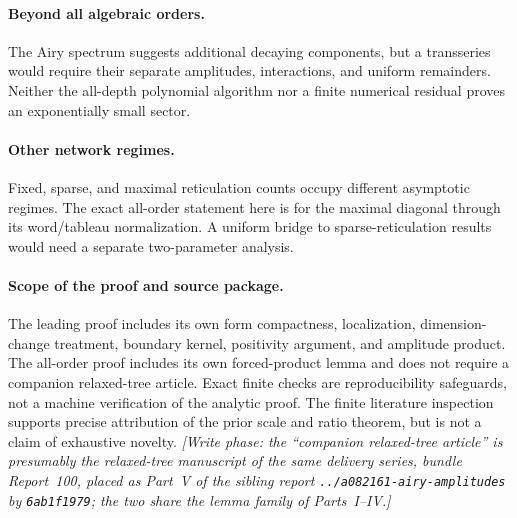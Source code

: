 \documentclass[11pt,letterpaper]{article}
\theoremstyle{remark}
\begin{document}
\paragraph{Beyond all algebraic orders.}
The Airy spectrum suggests additional decaying components, but a transseries would require their separate amplitudes, interactions, and uniform remainders. Neither the all-depth polynomial algorithm nor a finite numerical residual proves an exponentially small sector.

\paragraph{Other network regimes.}
Fixed, sparse, and maximal reticulation counts occupy different asymptotic regimes. The exact all-order statement here is for the maximal diagonal through its word/tableau normalization. A uniform bridge to sparse-reticulation results would need a separate two-parameter analysis.

\paragraph{Scope of the proof and source package.}
The leading proof includes its own form compactness, localization, dimension-change treatment, boundary kernel, positivity argument, and amplitude product. The all-order proof includes its own forced-product lemma and does not require a companion relaxed-tree article. Exact finite checks are reproducibility safeguards, not a machine verification of the analytic proof. The finite literature inspection supports precise attribution of the prior scale and ratio theorem, but is not a claim of exhaustive novelty. \emph{[Write phase: the ``companion relaxed-tree article'' is presumably the relaxed-tree manuscript of the same delivery series, bundle Report~100, placed as Part~V of the sibling report \textup{\nolinkurl{../a082161-airy-amplitudes}} by \texttt{6ab1f1979}; the two share the lemma family of Parts~I--IV.]}
\end{document}
